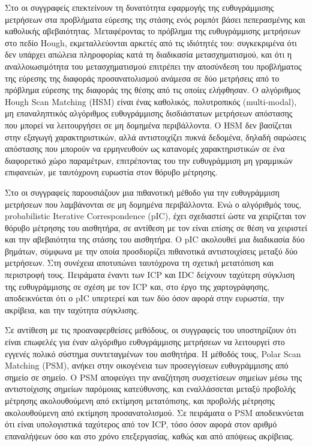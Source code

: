 Στο \cite{Censia} οι συγγραφείς επεκτείνουν τη δυνατότητα εφαρμογής της
ευθυγράμμισης μετρήσεων στα προβλήματα εύρεσης της στάσης ενός ρομπότ βάσει
πεπερασμένης και καθολικής αβεβαιότητας. Μεταφέροντας το πρόβλημα της
ευθυγράμμισης μετρήσεων στο πεδίο Hough, εκμεταλλεύονται αρκετές από τις
ιδιότητές του: συγκεκριμένα ότι δεν υπάρχει απώλεια πληροφορίας κατά τη
διαδικασία μετασχηματισμού, και ότι η αναλλοιωσιμότητα του μετασχηματισμού
επιτρέπει την αποσύνδεση του προβλήματος της εύρεσης της διαφοράς
προσανατολισμού ανάμεσα σε δύο μετρήσεις από το πρόβλημα εύρεσης της διαφοράς
της θέσης από τις οποίες ελήφθησαν. Ο αλγόριθμος Hough Scan Matching (HSM)
είναι ένας καθολικός, πολυτροπικός (multi-modal), μη επαναληπτικός αλγόριθμος
ευθυγράμμισης δισδιάστατων μετρήσεων απόστασης που μπορεί να λειτουργήσει σε μη
δομημένα περιβάλλοντα. Ο HSM δεν βασίζεται στην εξαγωγή χαρακτηριστικών, αλλά
αντιστοιχίζει πυκνά δεδομένα, δηλαδή σαρώσεις απόστασης που μπορούν να
ερμηνευθούν ως κατανομές χαρακτηριστικών σε ένα διαφορετικό χώρο παραμέτρων,
επιτρέποντας του την ευθυγράμμιση μη γραμμικών επιφανειών, με ταυτόχρονη
ευρωστία στον θόρυβο μέτρησης.

Στο \cite{Montesano2005} οι συγγραφείς παρουσιάζουν μια πιθανοτική μέθοδο για
την ευθυγράμμιση μετρήσεων που λαμβάνονται σε μη δομημένα περιβάλλοντα. Ενώ ο
αλγόριθμός τους, probabilistic Iterative Correspondence (pIC), έχει σχεδιαστεί
ώστε να χειρίζεται τον θόρυβο μέτρησης του αισθητήρα, σε αντίθεση με τον
\cite{Pfistera} είναι επίσης σε θέση να χειριστεί και την αβεβαιότητα της
στάσης του αισθητήρα. O pIC ακολουθεί μια διαδικασία δύο βημάτων, σύμφωνα με
την οποία προσδιορίζει πιθανοτικά αντιστοιχίσεις μεταξύ δύο μετρήσεων. Στη
συνέχεια αποτυπώνει ταυτόχρονα τη σχετική μετατόπιση και περιστροφή τους.
Πειράματα έναντι των ICP και IDC δείχνουν ταχύτερη σύγκλιση της ευθυγράμμισης
σε σχέση με τον ICP και, στο έργο της χαρτογράφησης, αποδεικνύεται ότι ο pIC
υπερτερεί και των δύο όσον αφορά στην ευρωστία, την ακρίβεια, και την ταχύτητα
σύγκλισης.

Σε αντίθεση με τις προαναφερθείσες μεθόδους, οι συγγραφείς του \cite{Diosi2005}
υποστηρίζουν ότι είναι επωφελές για έναν αλγόριθμο ευθυγράμμισης μετρήσεων να
λειτουργεί στο εγγενές πολικό σύστημα συντεταγμένων του αισθητήρα. Η μέθοδός
τους, Polar Scan Matching (PSM), ανήκει στην οικογένεια των προσεγγίσεων
ευθυγράμμισης από σημείο σε σημείο. O PSM αποφεύγει την αναζήτηση συσχετίσεων
σημείων μέσω της αντιστοίχισης σημείων παρόμοιας κατεύθυνσης, και
εναλλάσσεται μεταξύ προβολής μέτρησης ακολουθούμενη από εκτίμηση μετατόπισης,
και προβολής μέτρησης ακολουθούμενη από εκτίμηση προσανατολισμού. Σε πειράματα
ο PSM αποδεικνύεται ότι είναι υπολογιστικά ταχύτερος από τον ICP, τόσο όσον
αφορά στον αριθμό επαναλήψεων όσο και στο χρόνο επεξεργασίας, καθώς και από
απόψεως ακρίβειας.

